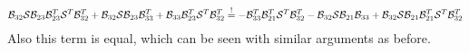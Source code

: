 \documentclass[]{scrartcl}
\numberwithin{equation}{section}
\begin{document}
\begin{landscape}
\begin{align*}
%
 \B_{32} \S \B_{23} \B_{23}^T \S^T \B_{32}^T
 + \B_{32} \S \B_{23} \B_{33}^T
 + \B_{33} \B_{23}^T \S^T \B_{32}^T \stackrel{!}=
  - \B_{33}^T \B_{21}^T \S^T \B_{32}^T
 -  \B_{32} \S \B_{21}\B_{33}
%
  + \B_{32} \S \B_{21}\B_{21}^T \S^T \B_{32}^T
\end{align*}
%
Also this term is equal, which can be seen with similar arguments as before.

\end{landscape}


%
\end{document}
